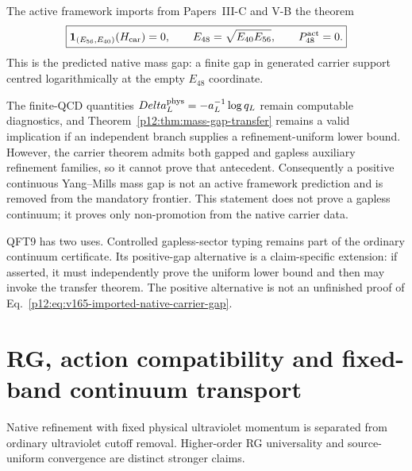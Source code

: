 \documentclass[12pt,a4paper]{article}
\begin{document}
\begin{theorem}
\label{p12:thm:v165-native-gap-active-prediction}
The active framework imports from Papers~III-C and V-B the theorem
\begin{equation}
 \label{p12:eq:v165-imported-native-carrier-gap}
 \boxed{
 \mathbf1_{(E_{56},E_{40})}(H_{\rm car})=0,
 \qquad
 E_{48}=\sqrt{E_{40}E_{56}},
 \qquad
 P_{48}^{\rm act}=0.}
\end{equation}
This is the predicted native mass gap: a finite gap in generated carrier
support centred logarithmically at the empty \(E_{48}\) coordinate.

The finite-QCD quantities
\(Delta_L^{\rm phys}=-a_L^{-1}\log q_L\) remain computable diagnostics, and
Theorem~\ref{p12:thm:mass-gap-transfer} remains a valid implication if an
independent branch supplies a refinement-uniform lower bound.  However, the
carrier theorem admits both gapped and gapless auxiliary refinement
families, so it cannot prove that antecedent.  Consequently a positive
continuous Yang--Mills mass gap is not an active framework prediction and is
removed from the mandatory frontier.  This statement does not prove a
gapless continuum; it proves only non-promotion from the native carrier data.
\end{theorem}

\begin{corollary}
\label{p12:cor:v165-qft9-claim-specific-status}
QFT9 has two uses.  Controlled gapless-sector typing remains part of the
ordinary continuum certificate.  Its positive-gap alternative is a
claim-specific extension: if asserted, it must independently prove the
uniform lower bound and then may invoke the transfer theorem.  The positive
alternative is not an unfinished proof of
Eq.~\eqref{p12:eq:v165-imported-native-carrier-gap}.
\end{corollary}



\section{RG, action compatibility and fixed-band continuum transport}
\label{p12:sec:v237-c5}
Native refinement with fixed physical ultraviolet momentum is separated from ordinary ultraviolet cutoff removal. Higher-order RG universality and source-uniform convergence are distinct stronger claims.

\end{document}
